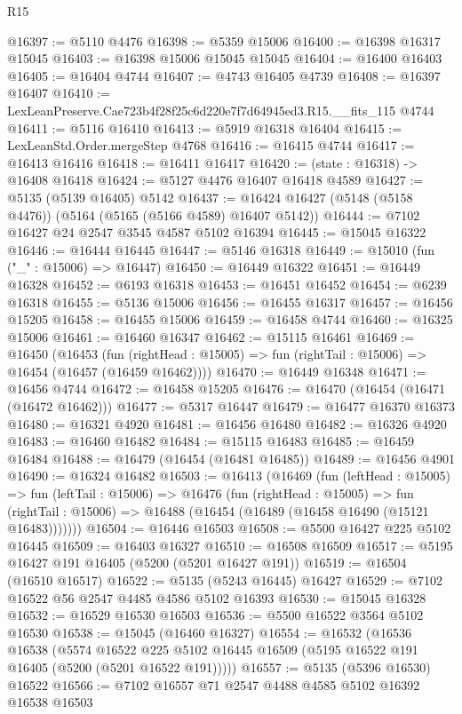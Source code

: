\begin{lexlean}{R15}
\begin{coremodule}
{{{{{{{{{{{@16397 := @5110 @4476
@16398 := @5359 @15006
@16400 := @16398 @16317 @15045
@16403 := @16398 @15006 @15045 @15045
@16404 := @16400 @16403
@16405 := @16404 @4744
@16407 := @4743 @16405 @4739
@16408 := @16397 @16407
@16410 := LexLeanPreserve.Cae723b4f28f25c6d220e7f7d64945ed3.R15.__fits_115 @4744
@16411 := @5116 @16410
@16413 := @5919 @16318 @16404
@16415 := LexLeanStd.Order.mergeStep @4768
@16416 := @16415 @4744
@16417 := @16413 @16416
@16418 := @16411 @16417
@16420 := (state : @16318) -> @16408 @16418
@16424 := @5127 @4476 @16407 @16418 @4589
@16427 := @5135 (@5139 @16405) @5142
@16437 := @16424 @16427 (@5148 (@5158 @4476)) (@5164 (@5165 (@5166 @4589) @16407 @5142))
@16444 := @7102 @16427 @24 @2547 @3545 @4587 @5102 @16394
@16445 := @15045 @16322
@16446 := @16444 @16445
@16447 := @5146 @16318
@16449 := @15010 (fun ("_" : @15006) => @16447)
@16450 := @16449 @16322
@16451 := @16449 @16328
@16452 := @6193 @16318
@16453 := @16451 @16452
@16454 := @6239 @16318
@16455 := @5136 @15006
@16456 := @16455 @16317
@16457 := @16456 @15205
@16458 := @16455 @15006
@16459 := @16458 @4744
@16460 := @16325 @15006
@16461 := @16460 @16347
@16462 := @15115 @16461
@16469 := @16450
    (@16453
      (fun (rightHead : @15005) => fun (rightTail : @15006) => @16454 (@16457 (@16459 @16462))))
@16470 := @16449 @16348
@16471 := @16456 @4744
@16472 := @16458 @15205
@16476 := @16470 (@16454 (@16471 (@16472 @16462)))
@16477 := @5317 @16447
@16479 := @16477 @16370 @16373
@16480 := @16321 @4920
@16481 := @16456 @16480
@16482 := @16326 @4920
@16483 := @16460 @16482
@16484 := @15115 @16483
@16485 := @16459 @16484
@16488 := @16479 (@16454 (@16481 @16485))
@16489 := @16456 @4901
@16490 := @16324 @16482
@16503 := @16413
    (@16469
      (fun (leftHead : @15005) =>
      fun (leftTail : @15006) =>
      @16476
        (fun (rightHead : @15005) =>
        fun (rightTail : @15006) => @16488 (@16454 (@16489 (@16458 @16490 (@15121 @16483)))))))
@16504 := @16446 @16503
@16508 := @5500 @16427 @225 @5102 @16445
@16509 := @16403 @16327
@16510 := @16508 @16509
@16517 := @5195 @16427 @191 @16405 (@5200 (@5201 @16427 @191))
@16519 := @16504 (@16510 @16517)
@16522 := @5135 (@5243 @16445) @16427
@16529 := @7102 @16522 @56 @2547 @4485 @4586 @5102 @16393
@16530 := @15045 @16328
@16532 := @16529 @16530 @16503
@16536 := @5500 @16522 @3564 @5102 @16530
@16538 := @15045 (@16460 @16327)
@16554 := @16532
    (@16536
      @16538
      (@5574
        @16522
        @225
        @5102
        @16445
        @16509
        (@5195 @16522 @191 @16405 (@5200 (@5201 @16522 @191)))))
@16557 := @5135 (@5396 @16530) @16522
@16566 := @7102 @16557 @71 @2547 @4488 @4585 @5102 @16392 @16538 @16503
}}}}}}}}}}}
\end{coremodule}
\end{lexlean}
